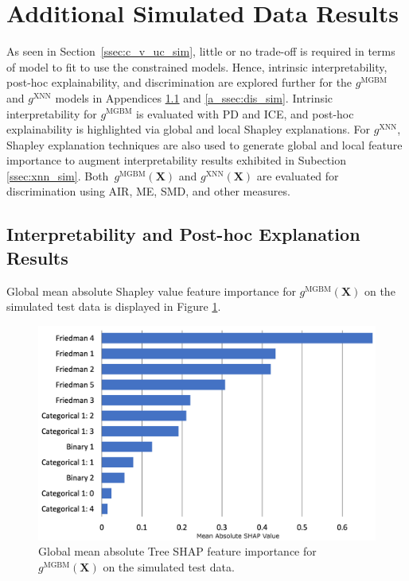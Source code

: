 \documentclass[information,article,accept,moreauthors,pdftex]{Definitions/mdpi}
\begin{document}
{\section{Additional Simulated Data Results}\label{a_sec:res_sim}

As seen in Section~\ref{ssec:c_v_uc_sim}, little or no trade-off is required in terms of model to fit to use the constrained models. Hence, intrinsic interpretability, post-hoc explainability, and discrimination are explored further for the $g^\text{MGBM}$ and $g^\text{XNN}$ models in Appendices \ref{a_ssec:int_ex_sim}  and  \ref{a_ssec:dis_sim}. Intrinsic interpretability for $g^\text{MGBM}$ is evaluated with PD and ICE, and post-hoc explainability is highlighted via global and local Shapley explanations. For $g^\text{XNN}$, Shapley explanation techniques are also used to generate global and local feature importance to augment interpretability results exhibited in Subection \ref{ssec:xnn_sim}. Both~$g^\text{MGBM}(\mathbf{X})$ and $g^\text{XNN}(\mathbf{X})$ are evaluated for discrimination using AIR, ME, SMD, and other measures.

\subsection{Interpretability and Post-hoc Explanation Results}\label{a_ssec:int_ex_sim}

Global mean absolute Shapley value feature importance for $g^{\text{MGBM}}(\mathbf{X})$ on the simulated test data is displayed in Figure \ref{fig:sim_mgbm_glob}. 

\begin{figure}[H]
\centering
	\captionsetup{width=16cm}
	\centering
	\includegraphics[width=12cm]{img/sim_mgbm_glob.png}
	\caption{Global mean absolute Tree SHAP feature importance for $g^\text{MGBM}(\mathbf{X})$ on the simulated test data.}
	\label{fig:sim_mgbm_glob}
\end{figure}  

}
\end{document}

